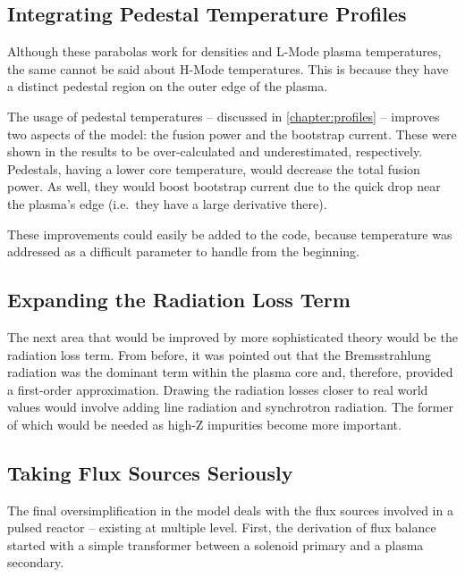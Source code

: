 \subsection{Integrating Pedestal Temperature Profiles}

 Although these parabolas work for densities and L-Mode plasma temperatures, the same cannot be said about H-Mode temperatures. This is because they have a distinct pedestal region on the outer edge of the plasma.

The usage of pedestal temperatures -- discussed in \cref{chapter:profiles} -- improves two aspects of the model: the fusion power and the bootstrap current. These were shown in the results to be over-calculated and underestimated, respectively. Pedestals, having a lower core temperature, would decrease the total fusion power. As well, they would boost bootstrap current due to the quick drop near the plasma's edge (i.e.\ they have a large derivative there).

These improvements could easily be added to the code, because temperature was addressed as a difficult parameter to handle from the beginning.

\subsection{Expanding the Radiation Loss Term}

The next area that would be improved by more sophisticated theory would be the radiation loss term. From before, it was pointed out that the Bremsstrahlung radiation was the dominant term within the plasma core and, therefore, provided a first-order approximation. Drawing the radiation losses closer to real world values would involve adding line radiation and synchrotron radiation. The former of which would be needed as high-Z impurities become more important.

\subsection{Taking Flux Sources Seriously}

The final oversimplification in the model deals with the flux sources involved in a pulsed reactor -- existing at multiple level. First, the derivation of flux balance started with a simple transformer between a solenoid primary and a plasma secondary. 


